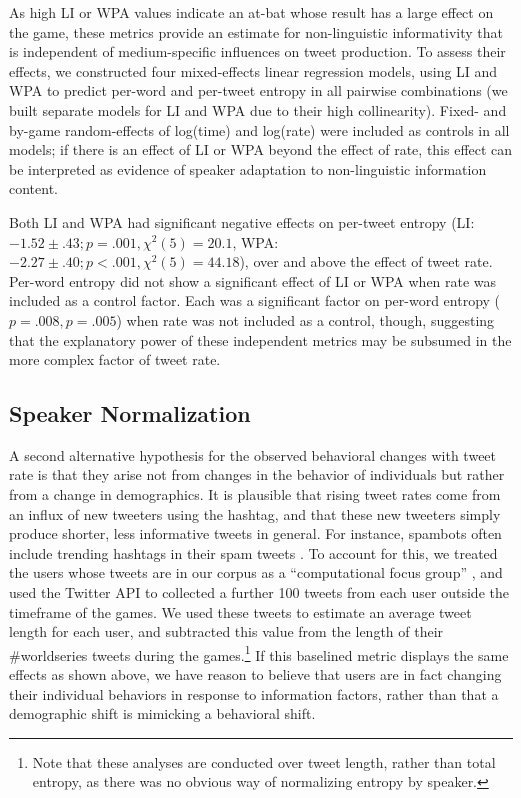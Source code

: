 \documentclass[11pt,letterpaper]{article}
\begin{document}
As high LI or WPA values indicate an at-bat whose result has a large effect on the game, these metrics provide an estimate for non-linguistic informativity that is independent of medium-specific influences on tweet production.  To assess their effects, we constructed four mixed-effects linear regression models, using LI and WPA to predict per-word and per-tweet entropy in all pairwise combinations (we built separate models for LI and WPA due to their high collinearity). Fixed- and by-game random-effects of log(time) and log(rate) were included as controls in all models; if there is an effect of LI or WPA beyond the effect of rate, this effect can be interpreted as evidence of speaker adaptation to non-linguistic information content.

Both LI and WPA had significant negative effects on per-tweet entropy (LI: $-1.52 \pm .43; p=.001, \chi^2(5)=20.1$, WPA: $-2.27 \pm .40; p<.001, \chi^2(5)=44.18$), over and above the effect of tweet rate.  Per-word entropy did not show a significant effect of LI or WPA when rate was included as a control factor. Each was a significant factor on per-word entropy ($p=.008,p=.005$) when rate was not included as a control, though, suggesting that the explanatory power of these independent metrics may be subsumed in the more complex factor of tweet rate.

\subsection{Speaker Normalization}
\label{sect:speaker-normalization}

A second alternative hypothesis for the observed behavioral changes with tweet rate is that they arise not from changes in the behavior of individuals but rather from a change in demographics.  It is plausible that rising tweet rates come from an influx of new tweeters using the hashtag, and that these new tweeters simply produce shorter, less informative tweets in general.  For instance, spambots often include trending hashtags in their spam tweets \cite{martinez2013}. To account for this, we treated the users whose tweets are in our corpus as a ``computational focus group'' \cite{lin2013,lin2014}, and used the Twitter API to collected a further 100 tweets from each user outside the timeframe of the games.  We used these tweets to estimate an average tweet length for each user, and subtracted this value from the length of their \#worldseries tweets during the games.\footnote{Note that these analyses are conducted over tweet length, rather than total entropy, as there was no obvious way of normalizing entropy by speaker.} If this baselined metric displays the same effects as shown above, we have reason to believe that users are in fact changing their individual behaviors in response to information factors, rather than that a demographic shift is mimicking a behavioral shift.
\end{document}
